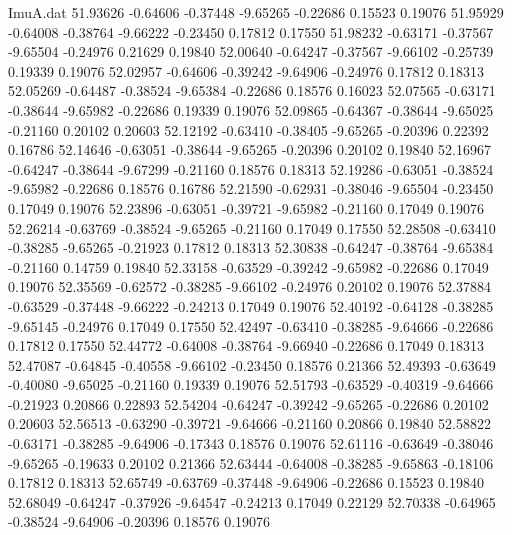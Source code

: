 \begin{filecontents}{ImuA.dat}
  51.93626   -0.64606   -0.37448   -9.65265   -0.22686    0.15523    0.19076
  51.95929   -0.64008   -0.38764   -9.66222   -0.23450    0.17812    0.17550
  51.98232   -0.63171   -0.37567   -9.65504   -0.24976    0.21629    0.19840
  52.00640   -0.64247   -0.37567   -9.66102   -0.25739    0.19339    0.19076
  52.02957   -0.64606   -0.39242   -9.64906   -0.24976    0.17812    0.18313
  52.05269   -0.64487   -0.38524   -9.65384   -0.22686    0.18576    0.16023
  52.07565   -0.63171   -0.38644   -9.65982   -0.22686    0.19339    0.19076
  52.09865   -0.64367   -0.38644   -9.65025   -0.21160    0.20102    0.20603
  52.12192   -0.63410   -0.38405   -9.65265   -0.20396    0.22392    0.16786
  52.14646   -0.63051   -0.38644   -9.65265   -0.20396    0.20102    0.19840
  52.16967   -0.64247   -0.38644   -9.67299   -0.21160    0.18576    0.18313
  52.19286   -0.63051   -0.38524   -9.65982   -0.22686    0.18576    0.16786
  52.21590   -0.62931   -0.38046   -9.65504   -0.23450    0.17049    0.19076
  52.23896   -0.63051   -0.39721   -9.65982   -0.21160    0.17049    0.19076
  52.26214   -0.63769   -0.38524   -9.65265   -0.21160    0.17049    0.17550
  52.28508   -0.63410   -0.38285   -9.65265   -0.21923    0.17812    0.18313
  52.30838   -0.64247   -0.38764   -9.65384   -0.21160    0.14759    0.19840
  52.33158   -0.63529   -0.39242   -9.65982   -0.22686    0.17049    0.19076
  52.35569   -0.62572   -0.38285   -9.66102   -0.24976    0.20102    0.19076
  52.37884   -0.63529   -0.37448   -9.66222   -0.24213    0.17049    0.19076
  52.40192   -0.64128   -0.38285   -9.65145   -0.24976    0.17049    0.17550
  52.42497   -0.63410   -0.38285   -9.64666   -0.22686    0.17812    0.17550
  52.44772   -0.64008   -0.38764   -9.66940   -0.22686    0.17049    0.18313
  52.47087   -0.64845   -0.40558   -9.66102   -0.23450    0.18576    0.21366
  52.49393   -0.63649   -0.40080   -9.65025   -0.21160    0.19339    0.19076
  52.51793   -0.63529   -0.40319   -9.64666   -0.21923    0.20866    0.22893
  52.54204   -0.64247   -0.39242   -9.65265   -0.22686    0.20102    0.20603
  52.56513   -0.63290   -0.39721   -9.64666   -0.21160    0.20866    0.19840
  52.58822   -0.63171   -0.38285   -9.64906   -0.17343    0.18576    0.19076
  52.61116   -0.63649   -0.38046   -9.65265   -0.19633    0.20102    0.21366
  52.63444   -0.64008   -0.38285   -9.65863   -0.18106    0.17812    0.18313
  52.65749   -0.63769   -0.37448   -9.64906   -0.22686    0.15523    0.19840
  52.68049   -0.64247   -0.37926   -9.64547   -0.24213    0.17049    0.22129
  52.70338   -0.64965   -0.38524   -9.64906   -0.20396    0.18576    0.19076

\end{filecontents}
